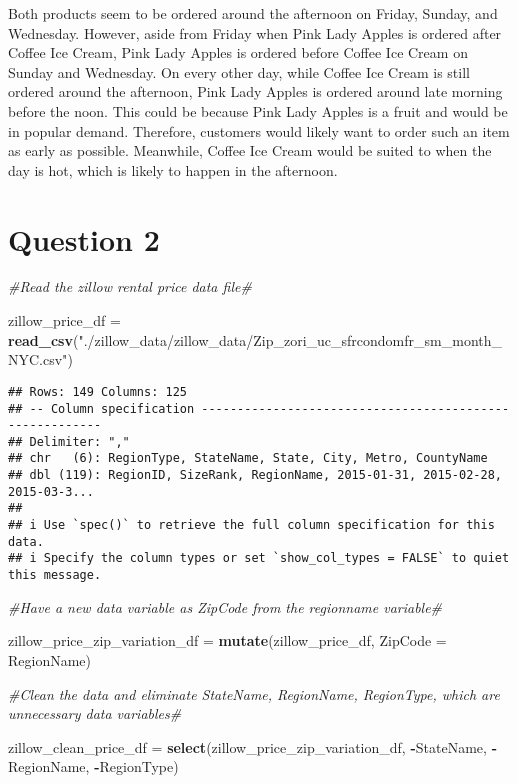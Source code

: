 \documentclass[
]{article}
\newenvironment{Shaded}{\begin{snugshade}}{\end{snugshade}}
\newcommand{\AttributeTok}[1]{\textcolor[rgb]{0.13,0.29,0.53}{#1}}
\newcommand{\CommentTok}[1]{\textcolor[rgb]{0.56,0.35,0.01}{\textit{#1}}}
\newcommand{\FunctionTok}[1]{\textcolor[rgb]{0.13,0.29,0.53}{\textbf{#1}}}
\newcommand{\NormalTok}[1]{#1}
\newcommand{\OtherTok}[1]{\textcolor[rgb]{0.56,0.35,0.01}{#1}}
\newcommand{\SpecialCharTok}[1]{\textcolor[rgb]{0.81,0.36,0.00}{\textbf{#1}}}
\newcommand{\StringTok}[1]{\textcolor[rgb]{0.31,0.60,0.02}{#1}}
\begin{document}
Both products seem to be ordered around the afternoon on Friday, Sunday,
and Wednesday. However, aside from Friday when Pink Lady Apples is
ordered after Coffee Ice Cream, Pink Lady Apples is ordered before
Coffee Ice Cream on Sunday and Wednesday. On every other day, while
Coffee Ice Cream is still ordered around the afternoon, Pink Lady Apples
is ordered around late morning before the noon. This could be because
Pink Lady Apples is a fruit and would be in popular demand. Therefore,
customers would likely want to order such an item as early as possible.
Meanwhile, Coffee Ice Cream would be suited to when the day is hot,
which is likely to happen in the afternoon.

\section{Question 2}\label{question-2}

\begin{Shaded}
\begin{Highlighting}[]
\CommentTok{\#Read the zillow rental price data file\#}

\NormalTok{zillow\_price\_df }\OtherTok{=} \FunctionTok{read\_csv}\NormalTok{(}\StringTok{"./zillow\_data/zillow\_data/Zip\_zori\_uc\_sfrcondomfr\_sm\_month\_NYC.csv"}\NormalTok{)}
\end{Highlighting}
\end{Shaded}

\begin{verbatim}
## Rows: 149 Columns: 125
## -- Column specification --------------------------------------------------------
## Delimiter: ","
## chr   (6): RegionType, StateName, State, City, Metro, CountyName
## dbl (119): RegionID, SizeRank, RegionName, 2015-01-31, 2015-02-28, 2015-03-3...
## 
## i Use `spec()` to retrieve the full column specification for this data.
## i Specify the column types or set `show_col_types = FALSE` to quiet this message.
\end{verbatim}

\begin{Shaded}
\begin{Highlighting}[]
\CommentTok{\#Have a new data variable as ZipCode from the regionname variable\#}

\NormalTok{zillow\_price\_zip\_variation\_df }\OtherTok{=} \FunctionTok{mutate}\NormalTok{(zillow\_price\_df, }\AttributeTok{ZipCode =}\NormalTok{ RegionName)}

\CommentTok{\#Clean the data and eliminate StateName, RegionName, RegionType, which are unnecessary data variables\#}

\NormalTok{zillow\_clean\_price\_df }\OtherTok{=} \FunctionTok{select}\NormalTok{(zillow\_price\_zip\_variation\_df, }\SpecialCharTok{{-}}\StringTok{\textasciigrave{}}\AttributeTok{StateName}\StringTok{\textasciigrave{}}\NormalTok{, }\SpecialCharTok{{-}}\NormalTok{RegionName, }\SpecialCharTok{{-}}\NormalTok{RegionType)}
\end{Highlighting}
\end{Shaded}
\end{document}
